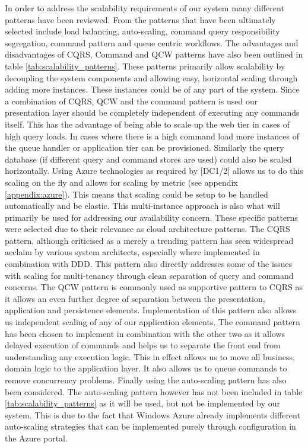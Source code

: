 In order to address the scalability requirements of our system many different patterns have been reviewed. From the patterns that have been ultimately selected include load balancing, auto-scaling, command query responsibility segregation, command pattern and queue centric workflows. The advantages and disadvantages of CQRS, Command and QCW  patterns have also been outlined in table \ref{tab:scalability_patterns}. These patterns primarily allow scalability by decoupling the system components and allowing easy, horizontal scaling through adding more instances. These instances could be of any part of the system. Since a combination of CQRS,  QCW and the command pattern  is used our presentation layer should be completely independent of executing any commands itself. This has the advantage of being able to scale up the web tier in cases of high query loads. In cases where there is a high command load more instances of the queue handler or application tier can be provisioned. Similarly the query database (if different query and command stores are used) could also be scaled horizontally. Using Azure technologies as required by [DC1/2] allows us to do this scaling on the fly and allows for scaling by metric (see appendix \ref{appendix:azure}). This means that scaling could be setup to be handled automatically and be elastic. This multi-instance approach is also what will primarily be used for addressing our availability concern. These specific patterns were selected due to their relevance as cloud architecture patterns. The CQRS pattern, although criticised as a merely a trending pattern has seen widespread acclaim by various system architects, especially where implemented in combination with DDD. This pattern also directly addresses some of the issues with scaling for multi-tenancy through clean separation of query and command concerns. The QCW pattern is commonly used as supportive pattern to CQRS as it allows an even further degree of separation between the presentation, application and persistence elements. Implementation of this pattern also allows us independent scaling of any of our application elements. The command pattern has been chosen to implement in combination with the other two as it allows delayed execution of commands and helps us to separate the front end from understanding any execution logic. This in effect allows us to move all business, domain logic to the application layer. It also allows us to queue commands to remove concurrency problems. Finally using the auto-scaling pattern has also been considered. The auto-scaling pattern however has not been included in table \ref{tab:scalability_patterns} as it will be used, but not be implemented by our system. This is due to the fact that Windows Azure already implements different auto-scaling strategies that can be implemented purely through configuration in the Azure portal.  


